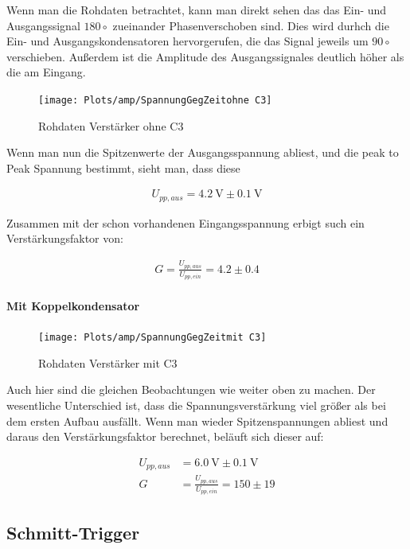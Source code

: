 \documentclass[12pt,twoside,a4paper]{scrartcl}
\begin{document}
				Wenn man die Rohdaten betrachtet, kann man direkt sehen das das Ein- und Ausgangssignal $180 \circ$ zueinander Phasenverschoben sind. Dies wird durhch die Ein- und Ausgangskondensatoren hervorgerufen, die das Signal jeweils um $90 \circ$ verschieben. Außerdem ist die Amplitude des Ausgangssignales deutlich höher als die am Eingang.

				\begin{figure}[H]
					\centering
					\texttt{[image: Plots/amp/SpannungGegZeitohne C3]}
					\caption{Rohdaten Verstärker ohne C3}
				\end{figure}

				Wenn man nun die Spitzenwerte der Ausgangsspannung abliest, und die peak to Peak Spannung bestimmt, sieht man, dass diese

				\begin{align*}
					U_{pp,aus} = \SI{4.2}{\volt} \pm \SI{0.1}{\volt}
				\end{align*}

				Zusammen mit der schon vorhandenen Eingangsspannung erbigt such ein Verstärkungsfaktor von:

				\begin{align}
					G = \frac{U_{pp,aus}}{U_{pp,ein}} = 4.2 \pm 0.4
				\end{align}

			\paragraph{Mit Koppelkondensator}

			\begin{figure}[H]
				\centering
				\texttt{[image: Plots/amp/SpannungGegZeitmit C3]}
				\caption{Rohdaten Verstärker mit C3}
			\end{figure}

				Auch hier sind die gleichen Beobachtungen wie weiter oben zu machen. Der wesentliche Unterschied ist, dass die Spannungsverstärkung viel größer als bei dem ersten Aufbau ausfällt. Wenn man wieder Spitzenspannungen abliest und daraus den Verstärkungsfaktor berechnet, beläuft sich dieser auf:

				\begin{align}
					U_{pp,aus} &= \SI{6.0}{\volt} \pm \SI{0.1}{\volt} \\
					G &= \frac{U_{pp,aus}}{U_{pp,ein}} = 150 \pm 19
				\end{align}


    \subsection{Schmitt-Trigger}
\end{document}
